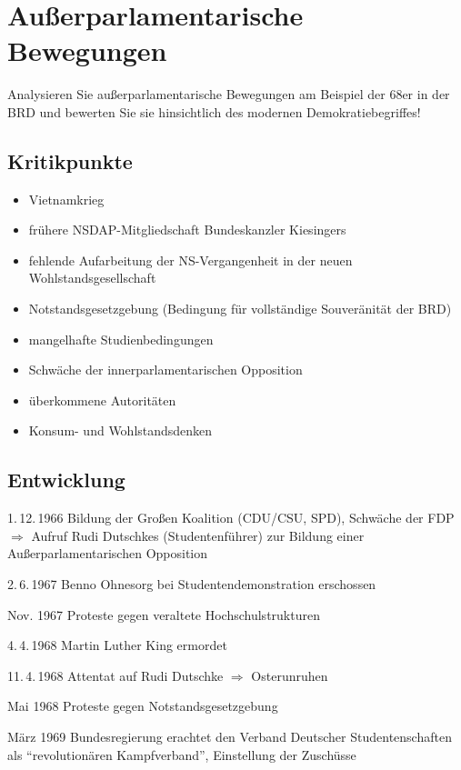 \section[Außerparlamentarische Bewegungen]{Außerparlamentarische
Bewegungen
}
\label{sec:ap-bew}

\begin{aufgabe}
Analysieren Sie außerparlamentarische Bewegungen am Beispiel der 68er
in der BRD und bewerten Sie sie hinsichtlich des modernen
Demokratiebegriffes! 
\end{aufgabe}

\subsection*{Kritikpunkte}

\begin{itemize}
\item Vietnamkrieg
\item frühere NSDAP-Mitgliedschaft Bundeskanzler Kiesingers
\item fehlende Aufarbeitung der NS-Vergangenheit in der neuen Wohlstandsgesellschaft
\item Notstandsgesetzgebung (Bedingung für vollständige Souveränität der BRD)
\item mangelhafte Studienbedingungen
\item Schwäche der innerparlamentarischen Opposition
\item überkommene Autoritäten
\item Konsum- und Wohlstandsdenken
\end{itemize}

\subsection*{Entwicklung}

\begin{chronik}
\item[1.\,12.\,1966] Bildung der Großen Koalition (CDU/CSU, SPD),
Schwäche der FDP
$\Rightarrow$ Aufruf Rudi Dutschkes (Studentenführer) zur Bildung einer
Außerparlamentarischen Opposition
\item[2.\,6.\,1967] Benno Ohnesorg bei Studentendemonstration
erschossen
\item[Nov. 1967] Proteste gegen veraltete Hochschulstrukturen
\item[4.\,4.\,1968] Martin Luther King ermordet
\item[11.\,4.\,1968] Attentat auf Rudi Dutschke $\Rightarrow$
Osterunruhen
\item[Mai 1968] Proteste gegen Notstandsgesetzgebung
\item[März 1969] Bundesregierung erachtet den Verband Deutscher
Studentenschaften als \enquote{revolutionären Kampfverband},
Einstellung der Zuschüsse
\end{chronik}

